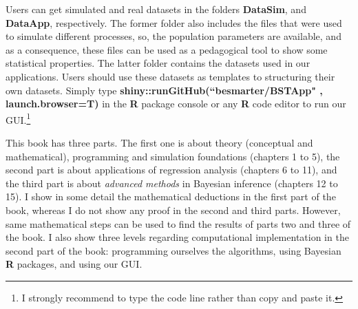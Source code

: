 Users can get simulated and real datasets in the folders \textbf{DataSim}, and \textbf{DataApp}, respectively. The former folder also includes the files that were used to simulate different processes, so, the population parameters are available, and as a consequence, these files can be used as a pedagogical tool to show some statistical properties. The latter folder contains the datasets used in our applications. Users should use these datasets as templates to structuring their own datasets. Simply type \textbf{shiny::runGitHub(``besmarter/BSTApp" , launch.browser=T)} in the \textbf{R} package console or any \textbf{R} code editor to run our GUI.\footnote{I strongly recommend to type the code line rather than copy and paste it.}

This book has three parts. The first one is about theory (conceptual and mathematical), programming and simulation foundations (chapters 1 to 5), the second part is about applications of regression analysis (chapters 6 to 11), and the third part is about \textit{advanced methods} in Bayesian inference (chapters 12 to 15). I show in some detail the mathematical deductions in the first part of the book, whereas I do not show any proof in the second and third parts. However, same mathematical steps can be used to find the results of parts two and three of the book. I also show three levels regarding computational implementation in the second part of the book: programming ourselves the algorithms, using Bayesian \textbf{R} packages, and using our GUI. 

